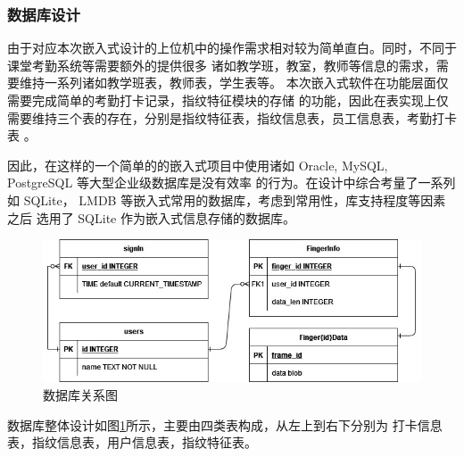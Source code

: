     \subsubsection{数据库设计}

    由于对应本次嵌入式设计的上位机中的操作需求相对较为简单直白。同时，不同于课堂考勤系统等需要额外的提供很多
    诸如教学班，教室，教师等信息的需求，需要维持一系列诸如教学班表，教师表，学生表等\cite{基于WiFi探针的智能考勤系统设计}。
    本次嵌入式软件在功能层面仅需要完成简单的考勤打卡记录，指纹特征模块的存储
    的功能，因此在表实现上仅需要维持三个表的存在，分别是指纹特征表，指纹信息表，员工信息表，考勤打卡表
    。

    因此，在这样的一个简单的的嵌入式项目中使用诸如 Oracle, MySQL, PostgreSQL 等大型企业级数据库是没有效率
    的行为。在设计中综合考量了一系列如 SQLite， LMDB 等嵌入式常用的数据库，考虑到常用性，库支持程度等因素之后
    选用了 SQLite 作为嵌入式信息存储的数据库。

    \begin{figure}[ht]
    \centering
    \includegraphics[scale=0.6]{imgs/数据库关系图.jpg}
    \caption{数据库关系图}    \label{fig:db-total}
    \end{figure}

    数据库整体设计如图\ref{fig:db-total}所示，主要由四类表构成，从左上到右下分别为
    打卡信息表，指纹信息表，用户信息表，指纹特征表。

